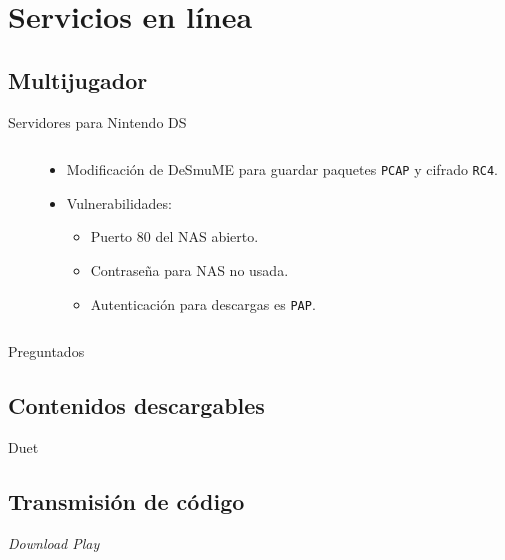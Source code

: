
\section{Servicios en línea}
\subsection{Multijugador}
\begin{frame}{Servidores para Nintendo DS}
\begin{columns}

\begin{column}{0.5\textwidth}
\begin{center}
\end{center}
\end{column}

\begin{column}{0.5\textwidth}
\begin{itemize}
    \item<2-> Modificación de DeSmuME para guardar paquetes \texttt{PCAP} y cifrado \texttt{RC4}.

    \item<4-> Vulnerabilidades:
    \begin{itemize}
        \item<5-> Puerto 80 del NAS abierto.

        \item<6-> Contraseña para NAS no usada.

        \item<7-> Autenticación para descargas es \texttt{PAP}.
    \end{itemize}
\end{itemize}
\end{column}

\end{columns}
\end{frame}

\begin{frame}{Preguntados}

\end{frame}

\subsection{Contenidos descargables}
\begin{frame}{Duet}

\end{frame}

\subsection{Transmisión de código}
\begin{frame}{\textit{Download Play}}

\end{frame}
